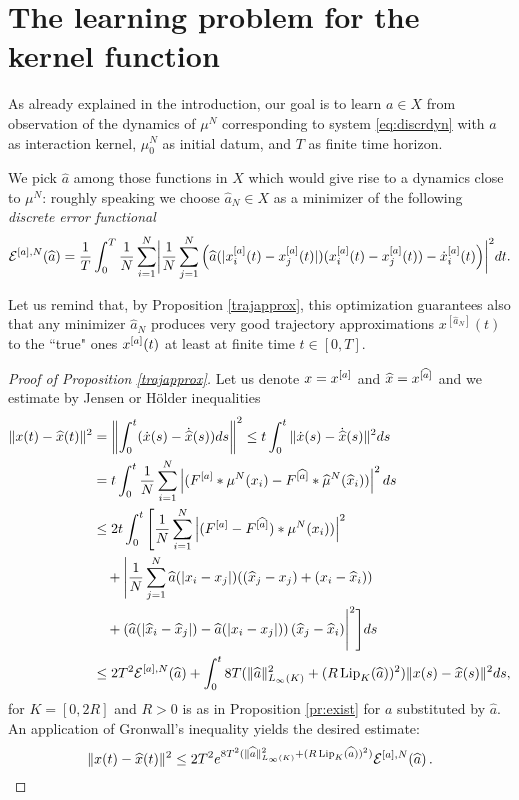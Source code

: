 
\section{The learning problem for the kernel function}\label{sec:learn}

As already explained in the introduction, our goal is to learn $a \in X$ from observation of the dynamics of $\mu^N$ corresponding to system \eqref{eq:discrdyn} with $a$ as interaction kernel, $\mu_0^N$ as initial datum, and $T$ as finite time horizon.

We pick $\widehat a$ among those functions in $X$ which would give rise to a dynamics close to $\mu^N$: roughly speaking we choose $\widehat a_N \in X$ as a minimizer of the following \textit{discrete error functional}
\begin{align}\label{eq-def-error}
	\begin{split}
	\mathcal E^{[a],N}(\widehat a) = \frac{1}{T}\int_0^T\frac{1}{N}\sum_{i=1}^N\biggl|\frac{1}{N}\sum_{j=1}^N
			\left(\widehat a(|x^{[a]}_i(t)-x^{[a]}_j(t)|)(x^{[a]}_i(t) - x^{[a]}_j(t))-\dot{x}^{[a]}_i(t)\right)\biggr|^2 dt.
	\end{split}
\end{align}

Let us remind that, by Proposition \ref{trajapprox}, this optimization guarantees also that any minimizer $\widehat a_N$ produces very good trajectory approximations $x^{[\widehat a_N]}(t)$ to the
``true" ones $x^{[a]}(t)$ at least at finite time $t \in [0,T]$.

\begin{proof}[Proof of Proposition \ref{trajapprox}]
Let us denote $x=x^{[a]} $ and $\widehat x =x^{[\widehat a]}  $ and we estimate by Jensen or H\"older inequalities
\begin{align*}
\|x(t) - \widehat x(t) \|^2 & = \left \| \int_0^t ( \dot x(s) - \dot{\widehat x}(s)) ds \right \|^2 \leq  t \int_0^t \| \dot x(s) - \dot{\widehat x}(s) \|^2 ds \\
&=  t \int_0^t \frac{1}{N} \sum_{i=1}^N \left | (F^{[a]} * \mu^N(x_i)- F^{[\widehat a]} * \widehat \mu^N(\widehat x_i)) \right |^2 ds\\
&\leq 2 t \int_0^t \Bigg[  \frac{1}{N} \sum_{i=1}^N \left| (F^{[a]} - F^{[\widehat a]}) *  \mu^N( x_i)) \right |^2 \\
&\quad +\Bigg| \frac{1}{N} \sum_{j=1}^N \widehat a(|x_i-x_j|)( (\widehat x_j - x_j) + (x_i-\widehat x_i))  \\
&\quad+ \left(\widehat a(| \widehat x_i-\widehat x_j|) -  \widehat a(| x_i- x_j |)\right) (\widehat x_j - \widehat x_i) \Bigg|^2  \Bigg ] ds \\
&\leq 2 T^2 \mathcal E^{[a],N}(\widehat a) +  \int_0^t 8 T( \|\widehat a\|_{L_\infty(K)}^2 + (R \operatorname{Lip}_K(\widehat a) ) ^2 )\|x(s) - \widehat x(s) \|^2  ds,
\end{align*}
for $K=[0,2 R]$ and $R>0$ is as in Proposition \ref{pr:exist} for $a$ substituted by $\widehat a$.
An application of Gronwall's inequality yields the desired estimate:
$$
\|x(t) - \widehat x(t) \|^2 \leq 2 T^2   e^{8 T^2( \|\widehat a\|_{L_\infty(K)}^2 + (R \operatorname{Lip}_K(\widehat a) ) ^2)} \mathcal E^{[a],N}(\widehat a)\,.
$$
\end{proof}


